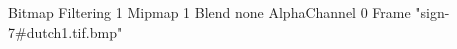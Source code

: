 {Bitmap
	{Filtering 1}
	{Mipmap 1}
	{Blend none}
	{AlphaChannel 0}
	{Frame "sign-7#dutch1.tif.bmp"}
}
